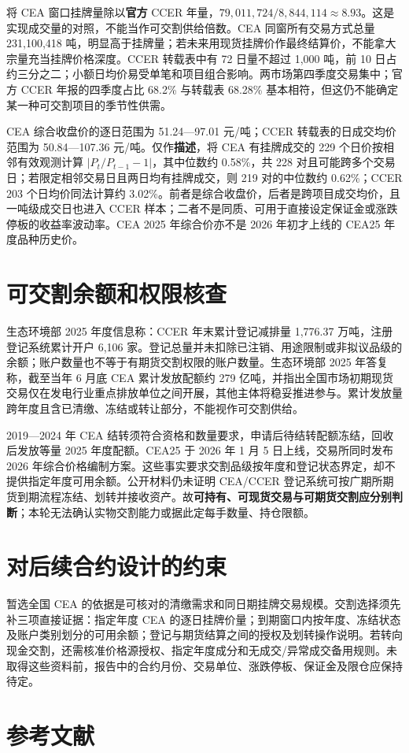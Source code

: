 \documentclass[UTF8,a4paper,11pt,oneside,fontset=fandol]{ctexart}
\begin{document}
将 CEA 窗口挂牌量除以\textbf{官方} CCER 年量，$79{,}011{,}724/8{,}844{,}114\approx8.93$。这是实现成交量的对照，不能当作可交割供给倍数。CEA 同窗所有交易方式总量 231,100,418 吨，明显高于挂牌量；若未来用现货挂牌价作最终结算价，不能拿大宗量充当挂牌价格深度。CCER 转载表中有 72 日量不超过 1,000 吨，前 10 日占约三分之二；小额日均价易受单笔和项目组合影响。两市场第四季度交易集中；官方 CCER 年报的四季度占比 68.2\% 与转载表 68.28\% 基本相符\cite{ccer2025annual}，但这仍不能确定某一种可交割项目的季节性供需。

CEA 综合收盘价的逐日范围为 51.24—97.01 元/吨；CCER 转载表的日成交均价范围为 50.84—107.36 元/吨。仅作\textbf{描述}，将 CEA 有挂牌成交的 229 个日价按相邻有效观测计算 $|P_t/P_{t-1}-1|$，其中位数约 0.58\%，共 228 对且可能跨多个交易日；若限定相邻交易日且两日均有挂牌成交，则 219 对的中位数约 0.62\%；CCER 203 个日均价同法计算约 3.02\%。前者是综合收盘价，后者是跨项目成交均价，且一吨级成交日也进入 CCER 样本；二者不是同质、可用于直接设定保证金或涨跌停板的收益率波动率。CEA 2025 年综合价亦不是 2026 年初才上线的 CEA25 年度品种历史价\cite{she2025cea25}。

\section{可交割余额和权限核查}
生态环境部 2025 年度信息称：CCER 年末累计登记减排量 1,776.37 万吨，注册登记系统累计开户 6,106 家\cite{mee2026}。登记总量并未扣除已注销、用途限制或非拟议品级的余额；账户数量也不等于有期货交割权限的账户数量。生态环境部 2025 年答复称，截至当年 6 月底 CEA 累计发放配额约 279 亿吨，并指出全国市场初期现货交易仅在发电行业重点排放单位之间开展，其他主体将稳妥推进参与\cite{mee2025reply}。累计发放量跨年度且含已清缴、冻结或转让部分，不能视作可交割供给。

2019—2024 年 CEA 结转须符合资格和数量要求，申请后待结转配额冻结，回收后发放等量 2025 年度配额\cite{mee2024carryover}。CEA25 于 2026 年 1 月 5 日上线，交易所同时发布 2026 年综合价格编制方案\cite{she2025cea25}。这些事实要求交割品级按年度和登记状态界定，却不提供指定年度可用余额。公开材料仍未证明 CEA/CCER 登记系统可按广期所期货到期流程冻结、划转并接收资产。故\textbf{可持有、可现货交易与可期货交割应分别判断}；本轮无法确认实物交割能力或据此定每手数量、持仓限额。

\section{对后续合约设计的约束}
暂选全国 CEA 的依据是可核对的清缴需求和同日期挂牌交易规模。交割选择须先补三项直接证据：指定年度 CEA 的逐日挂牌价量；到期窗口内按年度、冻结状态及账户类别划分的可用余额；登记与期货结算之间的授权及划转操作说明。若转向现金交割，还需核准价格源授权、指定年度成分和无成交/异常成交备用规则。未取得这些资料前，报告中的合约月份、交易单位、涨跌停板、保证金及限仓应保持待定。

\section*{参考文献}
\printbibliography[heading=none]
\end{document}
